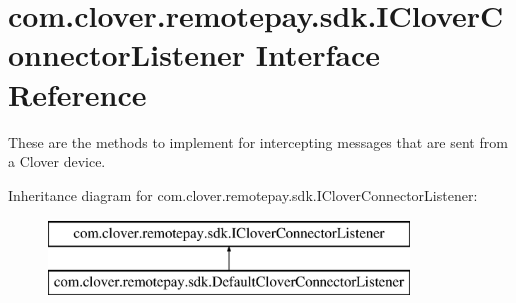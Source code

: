 \hypertarget{interfacecom_1_1clover_1_1remotepay_1_1sdk_1_1_i_clover_connector_listener}{}\section{com.\+clover.\+remotepay.\+sdk.\+I\+Clover\+Connector\+Listener Interface Reference}
\label{interfacecom_1_1clover_1_1remotepay_1_1sdk_1_1_i_clover_connector_listener}


These are the methods to implement for intercepting messages that are sent from a Clover device.  


Inheritance diagram for com.\+clover.\+remotepay.\+sdk.\+I\+Clover\+Connector\+Listener\+:\begin{figure}[H]
\begin{center}
\leavevmode
\includegraphics[height=2.000000cm]{interfacecom_1_1clover_1_1remotepay_1_1sdk_1_1_i_clover_connector_listener}
\end{center}
\end{figure}

